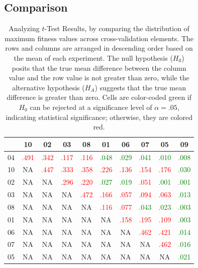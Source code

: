 \documentclass[sigchi,screen]{acmart}
\begin{document}
\subsection{Comparison}
\begin{table}[ht]
\begin{tabular}{c|*{9}{c}}
 &  10 & 02 & 03 & 08 & 01 & 06 & 07 & 05 & 09 \\
\hline
04 &  \textcolor{red}{.491} & \textcolor{red}{.342} & \textcolor{red}{.117} & \textcolor{red}{.116} & \textcolor{green}{.048} & \textcolor{green}{.029} & \textcolor{green}{.041} & \textcolor{green}{.010} & \textcolor{green}{.008} \\
10 &  NA & \textcolor{red}{.447} & \textcolor{red}{.333} & \textcolor{red}{.358} & \textcolor{red}{.226} & \textcolor{red}{.136} & \textcolor{red}{.154} & \textcolor{red}{.176} & \textcolor{green}{.030} \\
02 &  NA & NA & \textcolor{red}{.296} & \textcolor{red}{.220} & \textcolor{green}{.027} & \textcolor{green}{.019} & \textcolor{red}{.051} & \textcolor{green}{.001} & \textcolor{green}{.001} \\
03 &  NA & NA & NA & \textcolor{red}{.472} & \textcolor{red}{.166} & \textcolor{red}{.057} & \textcolor{red}{.094} & \textcolor{red}{.063} & \textcolor{green}{.013} \\
08 &  NA & NA & NA & NA & \textcolor{red}{.116} & \textcolor{red}{.077} & \textcolor{green}{.043} & \textcolor{green}{.023} & \textcolor{green}{.003} \\
01 &  NA & NA & NA & NA & NA & \textcolor{red}{.158} & \textcolor{red}{.195} & \textcolor{red}{.109} & \textcolor{green}{.003} \\
06 &  NA & NA & NA & NA & NA & NA & \textcolor{red}{.462} & \textcolor{red}{.421} & \textcolor{green}{.014} \\
07 &  NA & NA & NA & NA & NA & NA & NA & \textcolor{red}{.462} & \textcolor{green}{.016} \\
05 &  NA & NA & NA & NA & NA & NA & NA & NA & \textcolor{green}{.021} \\
\end{tabular}

\caption{Analyzing $t$-Test Results, by comparing the distribution of maximum fitness values across cross-validation elements. The rows and columns are arranged in descending order based on the mean of each experiment. The null hypothesis ($H_0$) posits that the true mean difference between the column value and the row value is not greater than zero, while the alternative hypothesis ($H_A$) suggests that the true mean difference is greater than zero. Cells are color-coded green if $H_0$ can be rejected at a significance level of $\alpha = .05$, indicating statistical significance; otherwise, they are colored red.}
\label{tbl:result-comparison}
\end{table}
\end{document}
